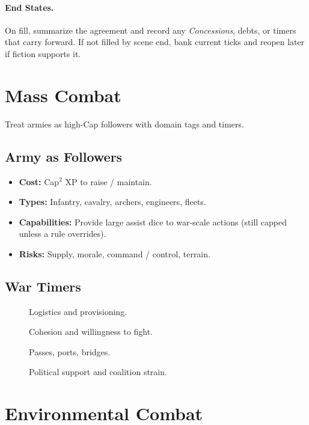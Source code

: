 \paragraph{End States.}
On fill, summarize the agreement and record any \emph{Concessions}, debts, or timers that carry forward. If not filled by scene end, bank current ticks and reopen later if fiction supports it.

\section{Mass Combat}\label{sec:mass_combat}
Treat armies as high-Cap followers with domain tags and timers.

\subsection{Army as Followers}\label{subsec:army_followers}
\begin{itemize}
    \item \textbf{Cost:} Cap\(^{2}\) XP to raise / maintain.
    \item \textbf{Types:} Infantry, cavalry, archers, engineers, fleets.
    \item \textbf{Capabilities:} Provide large assist dice to war-scale actions (still capped unless a rule overrides).
    \item \textbf{Risks:} Supply, morale, command / control, terrain.
\end{itemize}

\subsection{War Timers}\label{subsec:war_timers}
\begin{description}
    \item[] Logistics and provisioning.
    \item[] Cohesion and willingness to fight.
    \item[] Passes, ports, bridges.
    \item[] Political support and coalition strain.
\end{description}

\section{Environmental Combat}\label{sec:environmental_combat}


